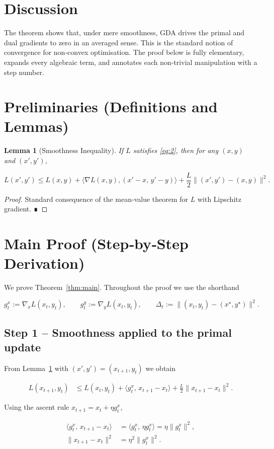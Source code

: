 \documentclass{article}
\newtheorem{lemma}{Lemma}
\begin{document}
\section*{Discussion}
The theorem shows that, under mere smoothness, GDA drives the primal and dual gradients to zero in an averaged sense. This is the standard notion of convergence for non‑convex optimisation. The proof below is fully elementary, expands every algebraic term, and annotates each non‑trivial manipulation with a step number.

\newpage
\section*{Preliminaries (Definitions and Lemmas)}
\begin{lemma}[Smoothness Inequality]\label{lem:smooth}
If \(L\) satisfies \eqref{eq:2}, then for any \((x,y)\) and \((x',y')\),

\[
L(x',y')\le L(x,y)+\langle\nabla L(x,y), (x'-x,\,y'-y)\rangle
+\frac{L}{2}\|(x',y')-(x,y)\|^{2}.
\tag{6}
\]
\end{lemma}
\begin{proof}
Standard consequence of the mean‑value theorem for \(L\) with Lipschitz gradient. ∎
\end{proof}

\section*{Main Proof (Step‑by‑Step Derivation)}
We prove Theorem~\ref{thm:main}. Throughout the proof we use the shorthand  

\[
g_t^{x}:=\nabla_x L(x_t,y_t),\qquad 
g_t^{y}:=\nabla_y L(x_t,y_t),\qquad 
\Delta_t:=\|(x_t,y_t)-(x^{\star},y^{\star})\|^{2}.
\]

\subsection*{Step 1 – Smoothness applied to the primal update}
From Lemma~\ref{lem:smooth} with \((x',y')=(x_{t+1},y_t)\) we obtain  

\[
\begin{aligned}
L(x_{t+1},y_t)
&\le L(x_t,y_t)
+ \langle g_t^{x},\,x_{t+1}-x_t\rangle
+\frac{L}{2}\|x_{t+1}-x_t\|^{2}.
\end{aligned}
\tag{7}
\]

Using the ascent rule \(x_{t+1}=x_t+\eta g_t^{x}\),

\[
\begin{aligned}
\langle g_t^{x},\,x_{t+1}-x_t\rangle
&= \langle g_t^{x},\,\eta g_t^{x}\rangle
= \eta\|g_t^{x}\|^{2},\\[1mm]
\|x_{t+1}-x_t\|^{2}
&= \eta^{2}\|g_t^{x}\|^{2}.
\end{aligned}
\tag{8}
\]
\end{document}
